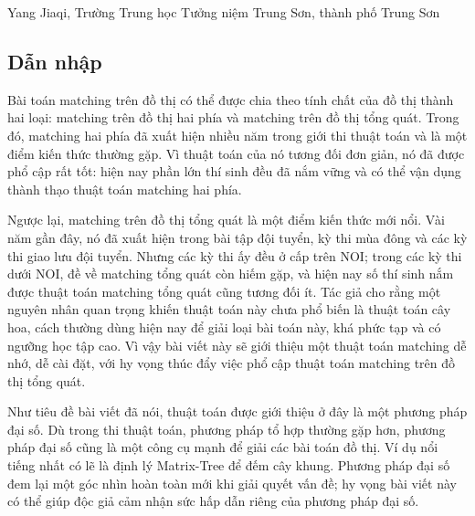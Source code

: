 \documentclass[11pt]{article}
\begin{document}
\begin{center}
Yang Jiaqi, Trường Trung học Tưởng niệm Trung Sơn, thành phố Trung Sơn
\end{center}

\renewcommand{\abstractname}{Tóm tắt}
\begin{abstract}
Bài toán matching trên đồ thị là một bài toán kinh điển của lý thuyết đồ thị,
có vị trí quan trọng cả trong học thuật lẫn trong thi thuật toán. Bài viết này
chủ yếu giới thiệu một thuật toán matching trên đồ thị tổng quát dựa trên đại
số tuyến tính, đồng thời đưa ra một số ứng dụng đơn giản của nó. Thuật toán
này rất khác với các phương pháp tổ hợp truyền thống để giải bài toán này; hy
vọng bản thân thuật toán và những tư tưởng dùng trong quá trình thu được thuật
toán có thể gợi mở cho độc giả.
\end{abstract}

\subsection*{Dẫn nhập}

Bài toán matching trên đồ thị có thể được chia theo tính chất của đồ thị thành
hai loại: matching trên đồ thị hai phía và matching trên đồ thị tổng quát.
Trong đó, matching hai phía đã xuất hiện nhiều năm trong giới thi thuật toán
và là một điểm kiến thức thường gặp. Vì thuật toán của nó tương đối đơn giản,
nó đã được phổ cập rất tốt: hiện nay phần lớn thí sinh đều đã nắm vững và có
thể vận dụng thành thạo thuật toán matching hai phía.

Ngược lại, matching trên đồ thị tổng quát là một điểm kiến thức mới nổi. Vài
năm gần đây, nó đã xuất hiện trong bài tập đội tuyển, kỳ thi mùa đông và các
kỳ thi giao lưu đội tuyển. Nhưng các kỳ thi ấy đều ở cấp trên NOI; trong các
kỳ thi dưới NOI, đề về matching tổng quát còn hiếm gặp, và hiện nay số thí
sinh nắm được thuật toán matching tổng quát cũng tương đối ít. Tác giả cho
rằng một nguyên nhân quan trọng khiến thuật toán này chưa phổ biến là thuật
toán cây hoa, cách thường dùng hiện nay để giải loại bài toán này, khá phức
tạp và có ngưỡng học tập cao. Vì vậy bài viết này sẽ giới thiệu một thuật toán
matching dễ nhớ, dễ cài đặt, với hy vọng thúc đẩy việc phổ cập thuật toán
matching trên đồ thị tổng quát.

Như tiêu đề bài viết đã nói, thuật toán được giới thiệu ở đây là một phương
pháp đại số. Dù trong thi thuật toán, phương pháp tổ hợp thường gặp hơn, phương
pháp đại số cũng là một công cụ mạnh để giải các bài toán đồ thị. Ví dụ nổi
tiếng nhất có lẽ là định lý Matrix-Tree để đếm cây khung. Phương pháp đại số
đem lại một góc nhìn hoàn toàn mới khi giải quyết vấn đề; hy vọng bài viết này
có thể giúp độc giả cảm nhận sức hấp dẫn riêng của phương pháp đại số.
\end{document}
